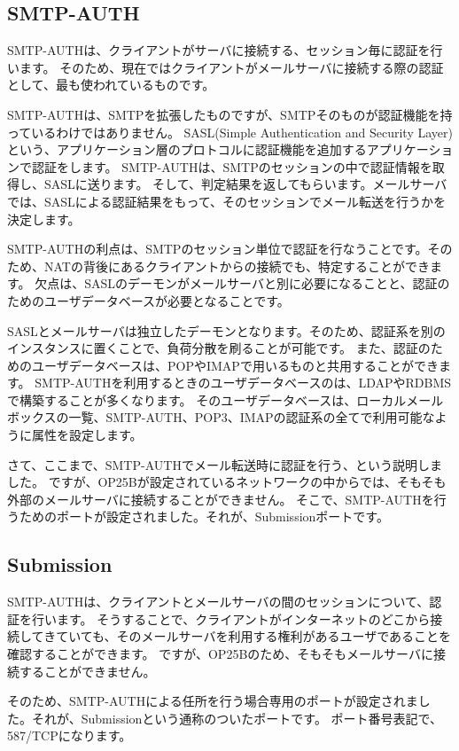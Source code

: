 \subsection{SMTP-AUTH}

SMTP-AUTHは、クライアントがサーバに接続する、セッション毎に認証を行います。
そのため、現在ではクライアントがメールサーバに接続する際の認証として、最も使われているものです。

SMTP-AUTHは、SMTPを拡張したものですが、SMTPそのものが認証機能を持っているわけではありません。
SASL(Simple Authentication and Security Layer)という、アプリケーション層のプロトコルに認証機能を追加するアプリケーションで認証をします。
SMTP-AUTHは、SMTPのセッションの中で認証情報を取得し、SASLに送ります。
そして、判定結果を返してもらいます。メールサーバでは、SASLによる認証結果をもって、そのセッションでメール転送を行うかを決定します。

SMTP-AUTHの利点は、SMTPのセッション単位で認証を行なうことです。そのため、NATの背後にあるクライアントからの接続でも、特定することができます。
欠点は、SASLのデーモンがメールサーバと別に必要になることと、認証のためのユーザデータベースが必要となることです。

SASLとメールサーバは独立したデーモンとなります。そのため、認証系を別のインスタンスに置くことで、負荷分散を刷ることが可能です。
また、認証のためのユーザデータベースは、POPやIMAPで用いるものと共用することができます。
SMTP-AUTHを利用するときのユーザデータベースのは、LDAPやRDBMSで構築することが多くなります。
そのユーザデータベースは、ローカルメールボックスの一覧、SMTP-AUTH、POP3、IMAPの認証系の全てで利用可能なように属性を設定します。

さて、ここまで、SMTP-AUTHでメール転送時に認証を行う、という説明しました。
ですが、OP25Bが設定されているネットワークの中からでは、そもそも外部のメールサーバに接続することができません。
そこで、SMTP-AUTHを行うためのポートが設定されました。それが、Submissionポートです。

\subsection{Submission}

SMTP-AUTHは、クライアントとメールサーバの間のセッションについて、認証を行います。
そうすることで、クライアントがインターネットのどこから接続してきていても、そのメールサーバを利用する権利があるユーザであることを確認することができます。
ですが、OP25Bのため、そもそもメールサーバに接続することができません。

そのため、SMTP-AUTHによる任所を行う場合専用のポートが設定されました。それが、Submissionという通称のついたポートです。
ポート番号表記で、587/TCPになります。

